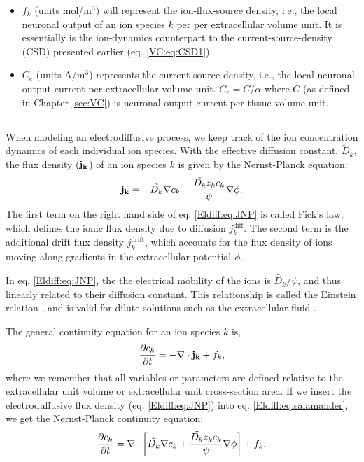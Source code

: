 \begin{itemize}
\item $f_k$ (units mol/m$^3$) will represent the ion-flux-source density, i.e., the local neuronal output of an ion species $k$ per per extracellular volume unit. It is essentially is the ion-dynamics counterpart to the current-source-density (CSD) presented earlier (eq. \ref{VC:eq:CSD1}).

\item $C_e$ (units A/m$^3$) represents the current source density, i.e., the local neuronal output current per extracellular volume unit. $C_e = C/\alpha$ where $C$ (as defined in Chapter \ref{sec:VC}) is neuronal output current per tissue volume unit.

\end{itemize}


\subsection{}
\label{sec:Eldiff:ionconcentrationdynamics}
When modeling an electrodiffusive process, we keep track of the ion concentration dynamics of each individual ion species. With the effective diffusion constant, $\tilde{D}_k$, the flux density (${\bf j_k}$) of an ion species $k$ is given by the Nernst-Planck equation:
\begin{equation}
{\bf j_k} = - \tilde{D_k} {\bf \nabla} c_{k} - \frac{\tilde{D_k} z_k c_k}{\psi} {\bf \nabla} \phi.
\label{Eldiff:eq:JNP}
\end{equation}
The first term on the right hand side of eq. \ref{Eldiff:eq:JNP} is called Fick's law, which defines the ionic flux density due to diffusion $j_{k}^\text{diff}$. The second term is the additional drift flux density $j_{k}^\text{drift}$, which accounts for the flux density of ions moving along gradients in the extracellular potential $\phi$.

In eq. \ref{Eldiff:eq:JNP}, the the electrical mobility of the ions is $\tilde{D_k}/\psi$, and thus linearly related to their diffusion constant. This relationship is called the Einstein relation , and is valid for dilute solutions such as the extracellular fluid \citep{Grodzinsky2011}.

The general continuity equation for an ion species $k$ is,
\begin{equation}
\frac{\partial c_k}{\partial t} = - \nabla \cdot {\bf j_k} + f_k,
\label{Eldiff:eq:salamander}
\end{equation}
where we remember that all variables or parameters are defined relative to the extracellular unit volume or extracellular unit cross-section area. If we insert the electroduffusive flux density (eq. \ref{Eldiff:eq:JNP}) into eq. \ref{Eldiff:eq:salamander},
we get the Nernst-Planck continuity equation:
\begin{equation}
\frac{\partial c_k}{\partial t} = {\bf \nabla} \cdot \left[ \tilde{D_k} {\bf \nabla} c_k + \frac{\tilde{D_k} z_k c_k}{\psi} {\bf \nabla} \phi \right] + f_k.
\label{Eldiff:eq:NP}
\end{equation}

